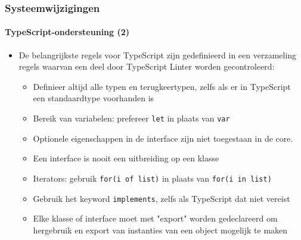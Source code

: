 \begin{frame}[fragile]
	\frametitle{Systeemwijzigingen}
	\framesubtitle{TypeScript-ondersteuning (2)}

	\begin{itemize}
		\item De belangrijkste regels voor TypeScript zijn gedefinieerd in een verzameling regels 
			waarvan een deel door TypeScript Linter worden gecontroleerd:

			\begin{itemize}
				\item Definieer altijd alle typen en terugkeertypen, zelfs als er in TypeScript een 
					standaardtype voorhanden is
				\item Bereik van variabelen: prefereer \texttt{let} in plaats van \texttt{var}
				\item Optionele eigenschappen in de interface zijn niet toegestaan in de core.
				\item Een interface is nooit een uitbreiding op een klasse
				\item Iterators: gebruik \texttt{for(i of list)} in plaats van \texttt{for(i in list)}
				\item Gebruik het keyword \texttt{implements}, zelfs als TypeScript dat niet vereist
				\item Elke klasse of interface moet met "export" worden gedeclareerd om hergebruik en 
					export van instanties van een object mogelijk te maken
			\end{itemize}

	\end{itemize}

\end{frame}


